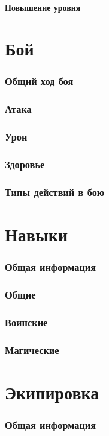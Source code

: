 \documentclass[10pt,twoside,twocolumn,openany]{book}
\begin{document}
\subsection{Повышение уровня}
\lipsum[1]

\part{Бой}
\section{Общий ход боя}
\lipsum[1]
\section{Атака}
\lipsum[1]
\section{Урон}
\lipsum[1]
\section{Здоровье}
\lipsum[1]
\section{Типы действий в бою}
\lipsum[1]

\part{Навыки}
\section{Общая информация}
\lipsum[1]
\section{Общие}
\lipsum[1]
\section{Воинские}
\lipsum[1]
\section{Магические}
\lipsum[1]

\part{Экипировка}
\section{Общая информация}
\lipsum[1]
\end{document}

